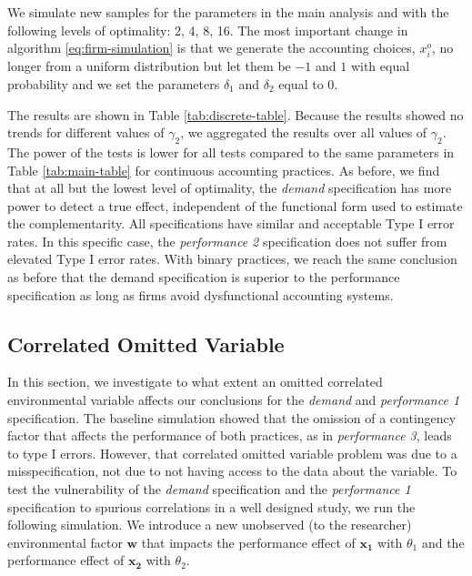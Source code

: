 \documentclass[12pt]{article}
\begin{document}
We simulate new samples for the parameters in the main analysis and with the following levels of optimality: 2, 4, 8, 16. The most important change in algorithm \eqref{eq:firm-simulation} is that we generate the accounting choices, $x_i^o$, no longer from a uniform distribution but let them be $-1$ and $1$ with equal probability and we set the parameters $\delta_1$ and $\delta_2$ equal to $0$.

The results are shown in Table \ref{tab:discrete-table}. Because the results showed no trends for different values of $\gamma_2$, we aggregated the results over all values of $\gamma_2$. The power of the tests is lower for all tests compared to the same parameters in Table \ref{tab:main-table} for continuous accounting practices. As before, we find that at all but the lowest level of optimality, the \emph{demand} specification has more power to detect a true effect, independent of the functional form used to estimate the complementarity. All specifications have similar and acceptable Type I error rates. In this specific case, the \emph{performance 2} specification does not suffer from elevated Type I error rates.  With binary practices, we reach the same conclusion as before that the demand specification is superior to the performance specification as long as firms avoid dysfunctional accounting systems. 



\subsection{Correlated Omitted Variable}\label{correlated-omitted}

In this section, we investigate to what extent an omitted correlated environmental variable affects our conclusions for the \emph{demand} and \emph{performance 1} specification. The baseline simulation showed that the omission of a contingency factor that affects the performance of both practices, as in \emph{performance 3}, leads to type I errors. However, that correlated omitted variable problem was due to a misspecification, not due to not having access to the data about the variable. To test the vulnerability of the \emph{demand} specification and the \emph{performance 1} specification to spurious correlations in a well designed study, we run the following simulation. We introduce a new unobserved (to the researcher) environmental factor \(\mathbf{w}\) that impacts the performance effect of \(\mathbf{x_1}\) with \(\theta_1\) and the performance effect of \(\mathbf{x_2}\) with \(\theta_2\). 
\end{document}
